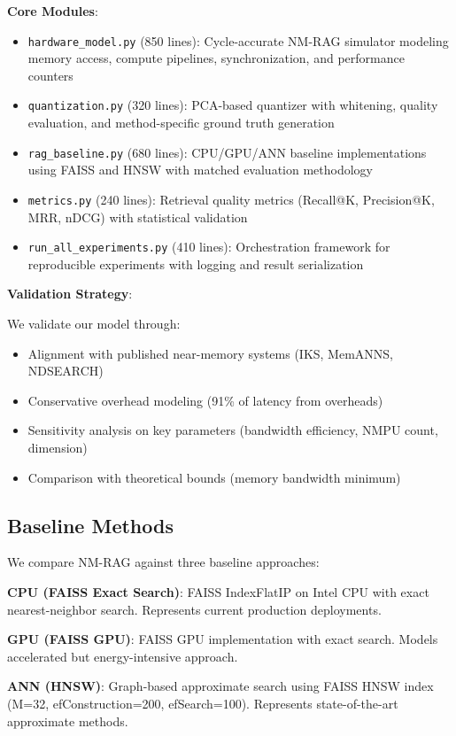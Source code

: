 \documentclass[conference]{IEEEtran}
\begin{document}
\textbf{Core Modules}:
\begin{itemize}
    \item \texttt{hardware\_model.py} (850 lines): Cycle-accurate NM-RAG simulator modeling memory access, compute pipelines, synchronization, and performance counters
    \item \texttt{quantization.py} (320 lines): PCA-based quantizer with whitening, quality evaluation, and method-specific ground truth generation
    \item \texttt{rag\_baseline.py} (680 lines): CPU/GPU/ANN baseline implementations using FAISS and HNSW with matched evaluation methodology
    \item \texttt{metrics.py} (240 lines): Retrieval quality metrics (Recall@K, Precision@K, MRR, nDCG) with statistical validation
    \item \texttt{run\_all\_experiments.py} (410 lines): Orchestration framework for reproducible experiments with logging and result serialization
\end{itemize}

\textbf{Validation Strategy}:

We validate our model through:
\begin{itemize}
    \item Alignment with published near-memory systems (IKS, MemANNS, NDSEARCH)
    \item Conservative overhead modeling (91\% of latency from overheads)
    \item Sensitivity analysis on key parameters (bandwidth efficiency, NMPU count, dimension)
    \item Comparison with theoretical bounds (memory bandwidth minimum)
\end{itemize}

\subsection{Baseline Methods}

We compare NM-RAG against three baseline approaches:

\textbf{CPU (FAISS Exact Search)}: FAISS IndexFlatIP on Intel CPU with exact nearest-neighbor search. Represents current production deployments.

\textbf{GPU (FAISS GPU)}: FAISS GPU implementation with exact search. Models accelerated but energy-intensive approach.

\textbf{ANN (HNSW)}: Graph-based approximate search using FAISS HNSW index (M=32, efConstruction=200, efSearch=100). Represents state-of-the-art approximate methods.
\end{document}
